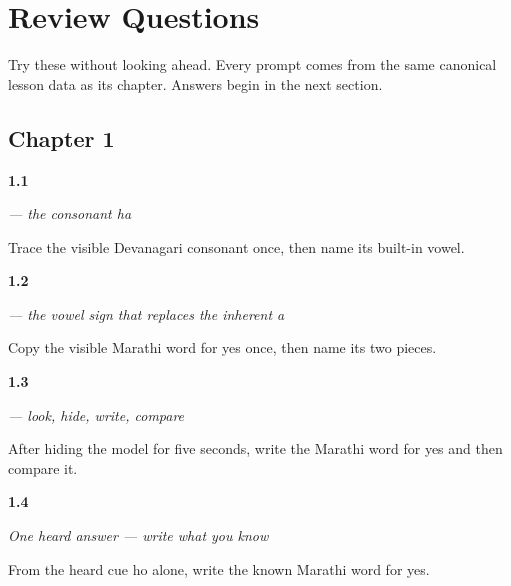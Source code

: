 
\chapter*{Review Questions}

Try these without looking ahead. Every prompt comes from the same canonical lesson data as its chapter. Answers begin in the next section.

\section*{Chapter 1}

\noindent\begin{minipage}[t]{\linewidth}
\raggedright
\hypertarget{review-MR-W01-ha-observe-check}{\textbf{1.1}} \emph{ — the consonant ha}\par
\small Trace the visible Devanagari consonant once, then name its built-in vowel.
\end{minipage}\par\medskip

\noindent\begin{minipage}[t]{\linewidth}
\raggedright
\hypertarget{review-MR-W01-o-matra-guided-copy-check}{\textbf{1.2}} \emph{ — the vowel sign that replaces the inherent a}\par
\small Copy the visible Marathi word for yes once, then name its two pieces.
\end{minipage}\par\medskip

\noindent\begin{minipage}[t]{\linewidth}
\raggedright
\hypertarget{review-MR-W01-ho-delayed-copy-check}{\textbf{1.3}} \emph{ — look, hide, write, compare}\par
\small After hiding the model for five seconds, write the Marathi word for yes and then compare it.
\end{minipage}\par\medskip

\noindent\begin{minipage}[t]{\linewidth}
\raggedright
\hypertarget{review-MR-W01-ho-dictation-answer}{\textbf{1.4}} \emph{One heard answer — write what you know}\par
\small From the heard cue ho alone, write the known Marathi word for yes.
\end{minipage}\par\medskip

